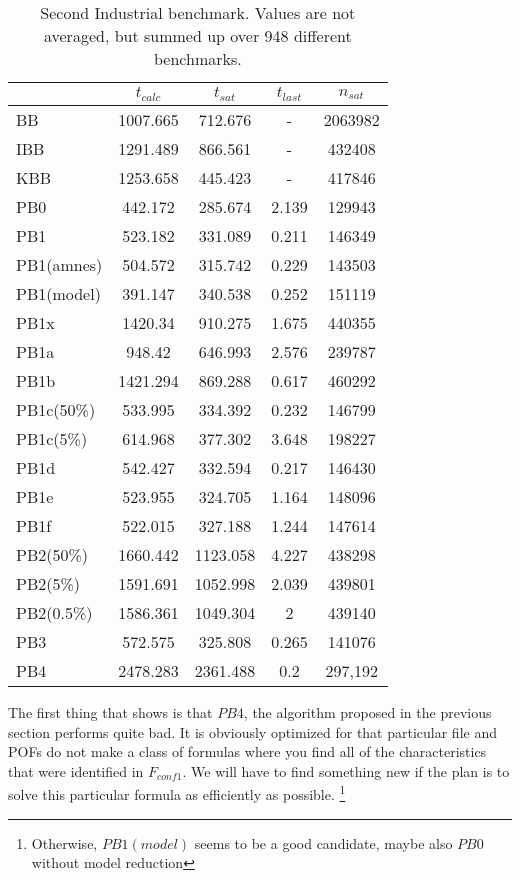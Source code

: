 \begin{wraptable}{R}{8cm}
\begin{tabular}{l| c c c c}
& $t_{calc}$ & $t_{sat}$ & $t_{last}$ & $n_{sat}$ \\
 \hline
BB & 1007.665 & 712.676 & - & 2063982 \\
IBB & 1291.489 & 866.561 & - & 432408 \\
KBB & 1253.658 & 445.423 & - & 417846 \\
PB0 & 442.172 & 285.674 & 2.139 & 129943 \\
PB1 & 523.182 & 331.089 & 0.211 & 146349 \\
PB1(amnes) & 504.572 & 315.742 & 0.229 & 143503 \\
PB1(model) & 391.147 & 340.538 & 0.252 & 151119 \\
PB1x & 1420.34 & 910.275 & 1.675 & 440355 \\
PB1a & 948.42 & 646.993 & 2.576 & 239787 \\
PB1b & 1421.294 & 869.288 & 0.617 & 460292 \\
PB1c(50\%) & 533.995 & 334.392 & 0.232 & 146799 \\
PB1c(5\%) & 614.968 & 377.302 & 3.648 & 198227 \\
PB1d & 542.427 & 332.594 & 0.217 & 146430 \\
PB1e & 523.955 & 324.705 & 1.164 & 148096 \\
PB1f & 522.015 & 327.188 & 1.244 & 147614 \\
PB2(50\%) & 1660.442 & 1123.058 & 4.227 & 438298 \\
PB2(5\%) & 1591.691 & 1052.998 & 2.039 & 439801 \\
PB2(0.5\%) & 1586.361 & 1049.304 & 2 & 439140 \\
PB3 & 572.575 & 325.808 & 0.265 & 141076 \\
PB4 & 2478.283 & 2361.488 & 0.2 &297,192 \\
\end{tabular}
\caption{Second Industrial benchmark. Values are not averaged, but summed up over 948 different benchmarks.}
\label{tab:vonThore2pof} %
\end{wraptable}

The first thing that shows is that $PB4$, the algorithm proposed in the previous section performs quite bad. It is obviously optimized for that particular file and POFs do not make a class of formulas where you find all of the characteristics that were identified in $F_{conf1}$. We will have to find something new if the plan is to solve this particular formula as efficiently as possible. \footnote{Otherwise, $PB1(model)$ seems to be a good candidate, maybe also $PB0$ without model reduction}

